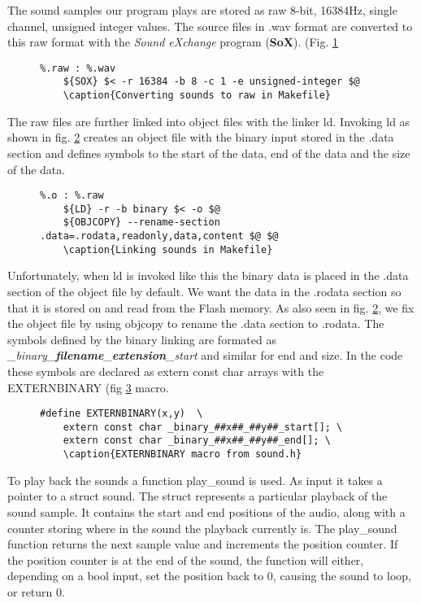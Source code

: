 The sound samples our program plays are stored as raw 8-bit, 16384Hz, single
channel, unsigned integer values. The source files in .wav format are converted
to this raw format with the \emph{Sound eXchange} program (\textbf{SoX}). (Fig.
\ref{Makefile:soundconvert}
\begin{figure}[h]
	\label{Makefile:soundconvert}
	\begin{lstlisting}
%.raw : %.wav
	${SOX} $< -r 16384 -b 8 -c 1 -e unsigned-integer $@
	\caption{Converting sounds to raw in Makefile}
	\end{lstlisting}
\end{figure}
The raw files are further linked into object files with the linker ld. Invoking
ld as shown in fig. \ref{Makefile:soundlink} creates an object file with the
binary input stored in the .data section and defines symbols to the start of the
data, end of the data and the size of the data.
\begin{figure}[h]
	\label{Makefile:soundlink}
	\begin{lstlisting}
%.o : %.raw
	${LD} -r -b binary $< -o $@
	${OBJCOPY} --rename-section .data=.rodata,readonly,data,content $@ $@
	\caption{Linking sounds in Makefile}
	\end{lstlisting}
\end{figure}
Unfortunately, when ld is invoked like this the binary data is placed in the
.data section of the object file by default. We want the data in the .rodata
section so that it is stored on and read from the Flash memory. As also seen in
fig. \ref{Makefile:soundlink}, we fix the object file by using objcopy to rename
the .data section to .rodata. The symbols defined by the binary linking are
formated as \emph{\_binary\_\textbf{filename}\_\textbf{extension}\_start} and
similar for end and size. In the code these symbols are declared as extern const
char arrays with the EXTERNBINARY (fig \ref{code:externbinary} macro.
\begin{figure}[h]
	\label{code:externbinary}
	\begin{lstlisting}
#define EXTERNBINARY(x,y)  \
	extern const char _binary_##x##_##y##_start[]; \
	extern const char _binary_##x##_##y##_end[]; \
	\caption{EXTERNBINARY macro from sound.h}
	\end{lstlisting}
\end{figure}

To play back the sounds a function play\_sound is used. As input it takes a
pointer to a struct sound. The struct represents a particular playback of the
sound sample. It contains the start and end positions of the audio, along with a
counter storing where in the sound the playback currently is. The play\_sound
function returns the next sample value and increments the position counter. If
the position counter is at the end of the sound, the function will either,
depending on a bool input, set the position back to 0, causing the sound to
loop, or return 0.

